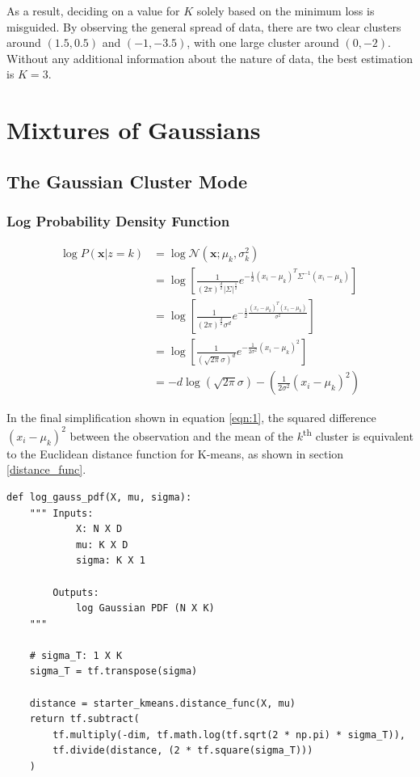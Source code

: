 \documentclass[letterpaper]{article}
\begin{document}
As a result, deciding on a value for $K$ solely based on the minimum loss is misguided. By observing the general spread of data, there are two clear clusters around $(1.5, 0.5)$ and $(-1, -3.5)$, with one large cluster around $(0, -2)$. Without any additional information about the nature of data, the best estimation is $K = 3$.

\newpage

\section{Mixtures of Gaussians}

\subsection{The Gaussian Cluster Mode}

\subsubsection{Log Probability Density Function}
\label{log_gauss_pdf}

\begin{align*}
\log P(\textbf{x} | z = k) &= \log \mathcal{N}(\textbf{x}; \mu_k, \sigma_k^2) \\
&=
\log \left[ \frac{1}{(2 \pi)^{\frac{d}{2}} |\Sigma|^{\frac{1}{2}}} e^{-\frac{1}{2} (x_i - \mu_k)^T \Sigma^{-1} (x_i - \mu_k)} \right] \\
&= 
\log \left[ \frac{1}{(2 \pi)^{\frac{d}{2}} \sigma^d} e^{-\frac{1}{2} \frac{(x_i - \mu_k)^T(x_i - \mu_k)}{\sigma^2}} \right] \\
&=
\log \left[ \frac{1}{\left(\sqrt{2 \pi} \sigma\right)^d} e^{-\frac{1}{2 \sigma^2} (x_i - \mu_k)^2} \right] \\
&= \label{eqn:1} \tag{1}
-d \log \left(\sqrt{2 \pi} \sigma\right) - \left( \frac{1}{2 \sigma^2} (x_i - \mu_k)^2 \right)
\end{align*}

\noindent
In the final simplification shown in equation \ref{eqn:1}, the squared difference $(x_i - \mu_k)^2$ between the observation and the mean of the $k$\textsuperscript{th} cluster is equivalent to the Euclidean distance function for K-means, as shown in section \ref{distance_func}.

\begin{lstlisting}
def log_gauss_pdf(X, mu, sigma):
    """ Inputs: 
            X: N X D
            mu: K X D
            sigma: K X 1

        Outputs:
            log Gaussian PDF (N X K)
    """

    # sigma_T: 1 X K
    sigma_T = tf.transpose(sigma)
    
    distance = starter_kmeans.distance_func(X, mu)
    return tf.subtract(
        tf.multiply(-dim, tf.math.log(tf.sqrt(2 * np.pi) * sigma_T)),
        tf.divide(distance, (2 * tf.square(sigma_T)))
    )
\end{lstlisting}
\end{document}
